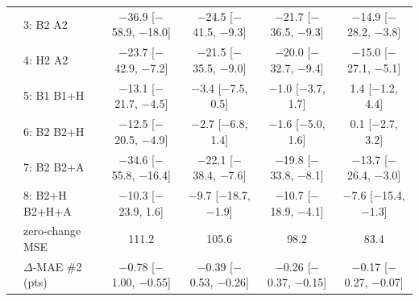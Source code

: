 \begin{table}[h]
{\begin{tabular}{llcccc}
 & 3: B2 \cto{} A2 & $-$36.9 [$-$58.9, $-$18.0] & $-$24.5 [$-$41.5, $-$9.3] & $-$21.7 [$-$36.5, $-$9.3] & $-$14.9 [$-$28.2, $-$3.8] \\
 & 4: H2 \cto{} A2 & $-$23.7 [$-$42.9, $-$7.2] & $-$21.5 [$-$35.5, $-$9.0] & $-$20.0 [$-$32.7, $-$9.4] & $-$15.0 [$-$27.1, $-$5.1] \\
 & 5: B1 \cto{} B1+H & $-$13.1 [$-$21.7, $-$4.5] & $-$3.4 [$-$7.5, 0.5] & $-$1.0 [$-$3.7, 1.7] & 1.4 [$-$1.2, 4.4] \\
 & 6: B2 \cto{} B2+H & $-$12.5 [$-$20.5, $-$4.9] & $-$2.7 [$-$6.8, 1.4] & $-$1.6 [$-$5.0, 1.6] & 0.1 [$-$2.7, 3.2] \\
 & 7: B2 \cto{} B2+A & $-$34.6 [$-$55.8, $-$16.4] & $-$22.1 [$-$38.4, $-$7.6] & $-$19.8 [$-$33.8, $-$8.1] & $-$13.7 [$-$26.4, $-$3.0] \\
 & 8: B2+H \cto{} B2+H+A & $-$10.3 [$-$23.9, 1.6] & $-$9.7 [$-$18.7, $-$1.9] & $-$10.7 [$-$18.9, $-$4.1] & $-$7.6 [$-$15.4, $-$1.3] \\
 & zero-change MSE & 111.2 & 105.6 & 98.2 & 83.4 \\
 & $\Delta$-MAE \#2 (pts) & $-$0.78 [$-$1.00, $-$0.55] & $-$0.39 [$-$0.53, $-$0.26] & $-$0.26 [$-$0.37, $-$0.15] & $-$0.17 [$-$0.27, $-$0.07] \\
\bottomrule
\end{tabular}
}
\end{table}

